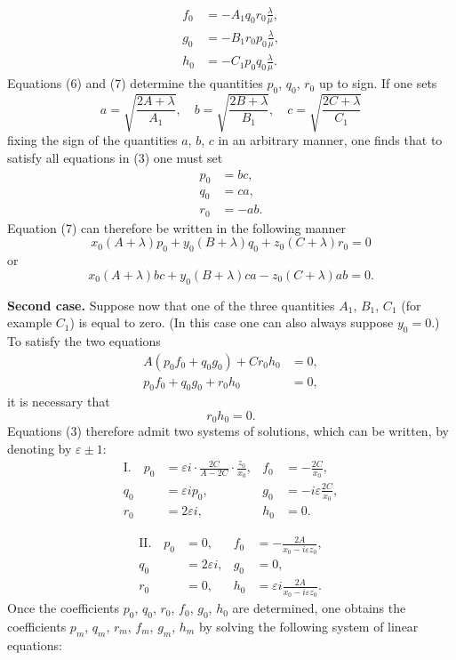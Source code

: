 \documentclass{article}
\begin{document}
\begin{equation}
\begin{aligned}
f_0 &= -A_1q_0r_0\frac{\lambda}{\mu}, \\
g_0 &= -B_1r_0p_0\frac{\lambda}{\mu}, \\
h_0 &= -C_1p_0q_0\frac{\lambda}{\mu}.
\end{aligned}
\end{equation}
Equations (6) and (7) determine the quantities $p_0$, $q_0$, $r_0$ up to sign.
If one sets
\[
a = \sqrt{\frac{2A + \lambda}{A_1}}, \quad b = \sqrt{\frac{2B + \lambda}{B_1}}, \quad c = \sqrt{\frac{2C + \lambda}{C_1}}
\]
fixing the sign of the quantities $a$, $b$, $c$ in an arbitrary manner, one finds that to satisfy all equations in (3) one must set
\begin{align*}
p_0 &= bc, \\
q_0 &= ca, \\
r_0 &= -ab.
\end{align*}
Equation (7) can therefore be written in the following manner
\[
x_0(A + \lambda)p_0 + y_0(B + \lambda)q_0 + z_0(C + \lambda)r_0 = 0
\]
or
\[
x_0(A + \lambda)bc + y_0(B + \lambda)ca - z_0(C + \lambda)ab = 0.
\]

\textbf{Second case.} Suppose now that one of the three quantities $A_1$, $B_1$, $C_1$ (for example $C_1$) is equal to zero. (In this case one can also always suppose $y_0 = 0$.) To satisfy the two equations
\begin{align*}
A(p_0f_0 + q_0g_0) + Cr_0h_0 &= 0, \\
p_0f_0 + q_0g_0 + r_0h_0 &= 0,
\end{align*}
it is necessary that
\[
r_0h_0 = 0.
\]
Equations (3) therefore admit two systems of solutions, which can be written, by denoting by $\varepsilon \pm 1$:
\begin{align*}
\text{I.} \quad p_0 &= \varepsilon i \cdot \frac{2C}{A - 2C} \cdot \frac{z_0}{x_0}, & f_0 &= -\frac{2C}{x_0}, \\
q_0 &= \varepsilon ip_0, & g_0 &= -i\varepsilon\frac{2C}{x_0}, \\
r_0 &= 2\varepsilon i, & h_0 &= 0.
\end{align*}

\begin{align*}
\text{II.} \quad p_0 &= 0, & f_0 &= -\frac{2A}{x_0 - i\varepsilon z_0}, \\
q_0 &= 2\varepsilon i, & g_0 &= 0, \\
r_0 &= 0, & h_0 &= \varepsilon i\frac{2A}{x_0 - i\varepsilon z_0}.
\end{align*}
Once the coefficients $p_0$, $q_0$, $r_0$, $f_0$, $g_0$, $h_0$ are determined, one obtains the coefficients
$p_m$, $q_m$, $r_m$, $f_m$, $g_m$, $h_m$ by solving the following system of linear equations:
\end{document}
